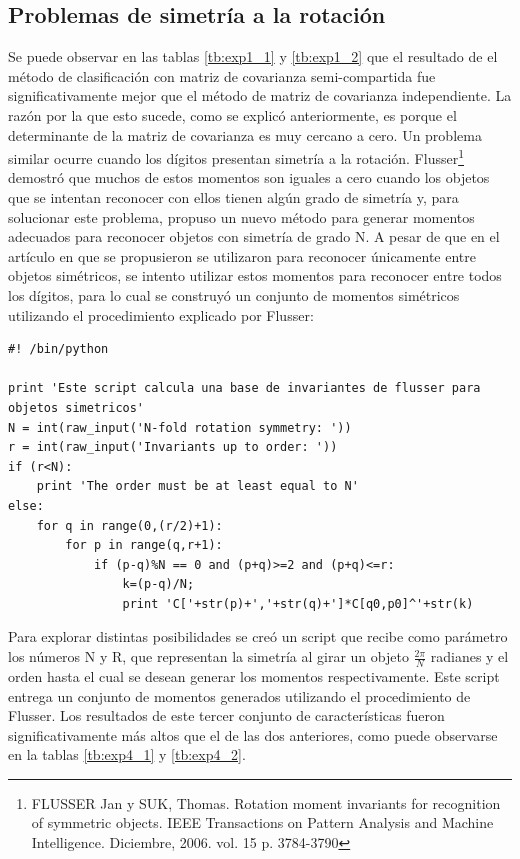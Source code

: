\documentclass[a4paper, 11pt, oneside]{report}
\newenvironment{mylisting}
{\begin{list}{}{\setlength{\leftmargin}{1em}}\item\scriptsize\bfseries}
{\end{list}}
\begin{document}
\subsection{Problemas de simetría a la rotación}

Se puede observar en las tablas \ref{tb:exp1_1} y \ref{tb:exp1_2} que el resultado de el método de clasificación con matriz de covarianza semi-compartida fue significativamente mejor que el método de matriz de covarianza independiente. La razón por la que esto sucede, como se explicó anteriormente, es porque el determinante de la matriz de covarianza es muy cercano a cero. Un problema similar ocurre cuando los dígitos presentan simetría a la rotación. Flusser\footnote{FLUSSER Jan y SUK, Thomas. Rotation moment invariants for recognition of symmetric objects. IEEE Transactions on Pattern Analysis and Machine Intelligence. Diciembre, 2006. vol. 15 p. 3784-3790} demostró que muchos de estos momentos son iguales a cero cuando los objetos que se intentan reconocer con ellos tienen algún grado de simetría y, para solucionar este problema, propuso un nuevo método para generar momentos adecuados para reconocer objetos con simetría de grado N. A pesar de que en el artículo en que se propusieron se utilizaron para reconocer únicamente entre objetos simétricos, se intento utilizar estos momentos para reconocer entre todos los dígitos, para lo cual se construyó un conjunto de momentos simétricos utilizando el procedimiento explicado por Flusser:

\begin{mylisting}
\begin{verbatim}
#! /bin/python

print 'Este script calcula una base de invariantes de flusser para objetos simetricos'
N = int(raw_input('N-fold rotation symmetry: '))
r = int(raw_input('Invariants up to order: '))
if (r<N):
    print 'The order must be at least equal to N'
else:
    for q in range(0,(r/2)+1):
        for p in range(q,r+1):
            if (p-q)%N == 0 and (p+q)>=2 and (p+q)<=r:
                k=(p-q)/N;
                print 'C['+str(p)+','+str(q)+']*C[q0,p0]^'+str(k) 
\end{verbatim}
\end{mylisting}

Para explorar distintas posibilidades se creó un script que recibe como parámetro los números N y R, que representan la simetría al girar un objeto $\frac{2\pi}{N}$ radianes y el orden hasta el cual se desean generar los momentos respectivamente. Este script entrega un conjunto de momentos generados utilizando el procedimiento de Flusser. Los resultados de este tercer conjunto de características fueron significativamente más altos que el de las dos anteriores, como puede observarse en la tablas \ref{tb:exp4_1} y \ref{tb:exp4_2}.
\end{document}
